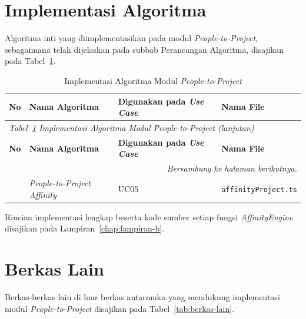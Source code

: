 \section{Implementasi Algoritma}

Algoritma inti yang diimplementasikan pada modul \emph{People-to-Project}, sebagaimana telah dijelaskan pada subbab Perancangan Algoritma, disajikan pada Tabel~\ref{tab:algoritma-impl}.

\begin{longtable}{p{0.5cm} p{5cm} p{2.5cm} >{\raggedright\arraybackslash}p{\dimexpr\linewidth-8cm-8\tabcolsep\relax}}
  \caption{Implementasi Algoritma Modul \emph{People-to-Project}}
  \label{tab:algoritma-impl} \\
  \toprule
    \textbf{No} & \textbf{Nama Algoritma} & \textbf{Digunakan pada \emph{Use Case}} & \textbf{Nama File} \\
  \midrule
  \endfirsthead
  \multicolumn{4}{l}{\small\textit{Tabel~\ref{tab:algoritma-impl} Implementasi Algoritma Modul \emph{People-to-Project} (lanjutan)}} \\
  \toprule
    \textbf{No} & \textbf{Nama Algoritma} & \textbf{Digunakan pada \emph{Use Case}} & \textbf{Nama File} \\
  \midrule
  \endhead
  \bottomrule
  \multicolumn{4}{r}{\textit{Bersambung ke halaman berikutnya.}} \\
  \endfoot
  \bottomrule
  \endlastfoot
    1 & \emph{People-to-Project Affinity} & UC05 & \texttt{affinityProject.ts} \\
\end{longtable}

Rincian implementasi lengkap beserta kode sumber setiap fungsi \emph{AffinityEngine} disajikan pada Lampiran~\ref{chap:lampiran-b}.

\section{Berkas Lain}

Berkas-berkas lain di luar berkas antarmuka yang mendukung implementasi modul \emph{People-to-Project} disajikan pada Tabel~\ref{tab:berkas-lain}.

